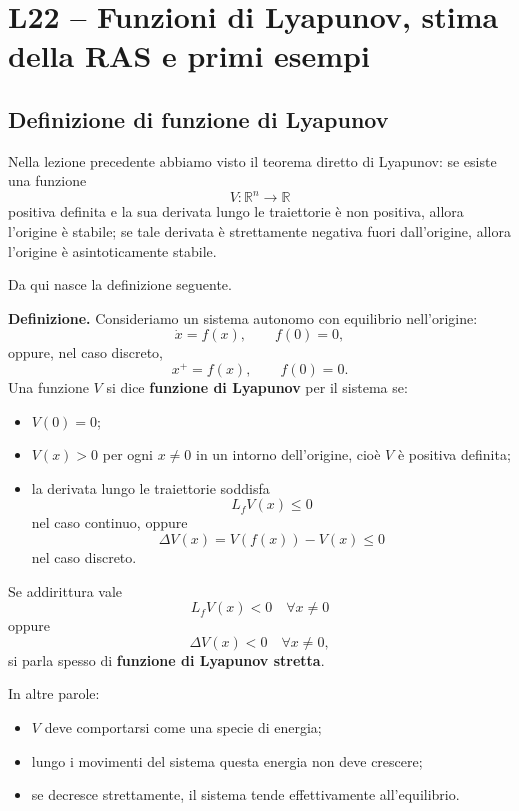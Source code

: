
\chapter{L22 -- Funzioni di Lyapunov, stima della RAS e primi esempi}
\label{chap:L22}

\section{Definizione di funzione di Lyapunov}

Nella lezione precedente abbiamo visto il teorema diretto di Lyapunov: se esiste una funzione
\[
V:\mathbb{R}^n \to \mathbb{R}
\]
positiva definita e la sua derivata lungo le traiettorie è non positiva, allora l'origine è stabile; se tale derivata è strettamente negativa fuori dall'origine, allora l'origine è asintoticamente stabile.

Da qui nasce la definizione seguente.

\medskip

\noindent
\textbf{Definizione.}
Consideriamo un sistema autonomo con equilibrio nell'origine:
\[
\dot x = f(x), \qquad f(0)=0,
\]
oppure, nel caso discreto,
\[
x^{+}=f(x), \qquad f(0)=0.
\]
Una funzione \(V\) si dice \textbf{funzione di Lyapunov} per il sistema se:
\begin{itemize}
    \item \(V(0)=0\);
    \item \(V(x)>0\) per ogni \(x\neq 0\) in un intorno dell'origine, cioè \(V\) è positiva definita;
    \item la derivata lungo le traiettorie soddisfa
    \[
    L_fV(x)\le 0
    \]
    nel caso continuo, oppure
    \[
    \Delta V(x)=V(f(x))-V(x)\le 0
    \]
    nel caso discreto.
\end{itemize}

Se addirittura vale
\[
L_fV(x)<0 \quad \forall x\neq 0
\]
oppure
\[
\Delta V(x)<0 \quad \forall x\neq 0,
\]
si parla spesso di \textbf{funzione di Lyapunov stretta}.

\medskip

\noindent
In altre parole:
\begin{itemize}
    \item \(V\) deve comportarsi come una specie di energia;
    \item lungo i movimenti del sistema questa energia non deve crescere;
    \item se decresce strettamente, il sistema tende effettivamente all'equilibrio.
\end{itemize}

